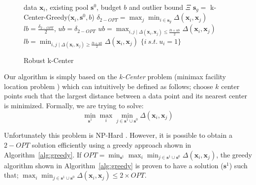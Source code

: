 \documentclass{article}
\begin{document}
    \begin{figure}
    \begin{minipage}{0.5\textwidth}
    \vspace{-8mm}
\begin{algorithm}[H]
   \caption{Robust k-Center}
   \label{alg:bin}
\begin{algorithmic}
    data $\mathbf{x}_i$, existing pool $\mathbf{s}^0$, budget $b$ and outlier bound $\Xi$
    $\mathbf{s}_g =$ k-Center-Greedy($\mathbf{x}_i, \mathbf{s}^0, b$)
   \STATE $\delta_{2-OPT} = \max_j \min_{i \in \mathbf{s}_g} \Delta(\mathbf{x}_i,\mathbf{x}_j)$ 
   \STATE $lb=\frac{\delta_{2-OPT}}{2}$, $ub=\delta_{2-OPT}$
   \REPEAT
   \STATE $ub=\max_{i,j \mid  \Delta(\mathbf{x}_i,\mathbf{x}_j) \leq \frac{lb+ub}{2}}  \Delta(\mathbf{x}_i,\mathbf{x}_j) $
   \ELSE
   \STATE $lb=\min_{i,j \mid   \Delta(\mathbf{x}_i,\mathbf{x}_j) \geq \frac{lb+ub}{2}}  \Delta(\mathbf{x}_i,\mathbf{x}_j) $
    \ENDIF
       $\{i\ s.t.\ u_i=1\}$
\end{algorithmic}
\end{algorithm}
\vspace{-5mm}
    \end{minipage}
  \end{figure}

Our algorithm is simply based on the \emph{k-Center} problem (minimax facility location problem \cite{facility}) which can intuitively be defined as follows; choose $k$ center points such that the largest distance between a data point and its nearest center is minimized. Formally, we are trying to solve:
\begin{equation}
\min_{\mathbf{s}^1} \max_i \min_{j \in \mathbf{s}^1 \cup \mathbf{s}^0} \Delta(\mathbf{x}_i,\mathbf{x}_j)
\end{equation}



Unfortunately this problem is NP-Hard \cite{cook}. However, it is possible to obtain a $2-OPT$ solution efficiently using a greedy approach shown in  Algorithm~\ref{alg:greedy}. If $OPT=\min_{\mathbf{s}^1} \max_i \min_{j \in \mathbf{s}^1 \cup \mathbf{s}^0} \Delta(\mathbf{x}_i,\mathbf{x}_j)$, the greedy algorithm shown in Algorithm~\ref{alg:greedy} is proven to have a solution ($\mathbf{s}^1$) such that; $ \max_i \min_{j \in \mathbf{s}^1 \cup \mathbf{s}^0} \Delta(\mathbf{x}_i,\mathbf{x}_j) \leq 2 \times OPT$.
\end{document}

